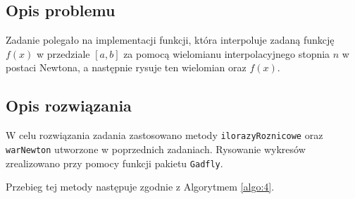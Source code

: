 \documentclass{classrep}
\begin{document}
	\subsection{Opis problemu}
		Zadanie polegało na implementacji funkcji, która interpoluje zadaną funkcję $f(x)$ w przedziale $[a,b]$ za pomocą wielomianu interpolacyjnego stopnia $n$ w postaci Newtona, a następnie rysuje ten wielomian oraz $f(x)$.


	\subsection{Opis rozwiązania}
		W celu rozwiązania zadania zastosowano metody \texttt{ilorazyRoznicowe} oraz \texttt{warNewton} utworzone w poprzednich zadaniach. Rysowanie wykresów zrealizowano przy pomocy funkcji pakietu \texttt{Gadfly}.
		
		Przebieg tej metody następuje zgodnie z Algorytmem \ref{algo:4}.
		
\end{document}
